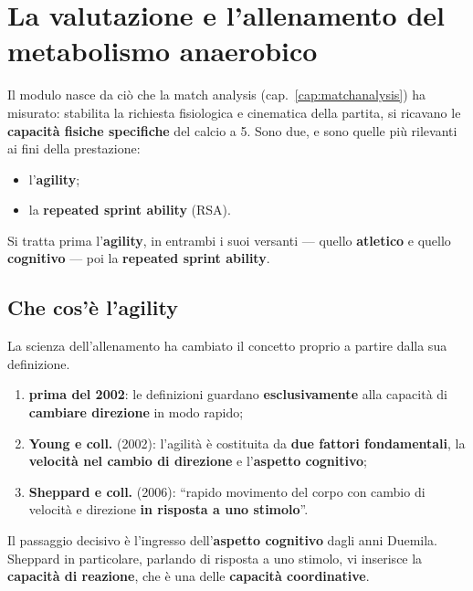 \chapter{La valutazione e l'allenamento del metabolismo anaerobico}
\label{cap:metabolismoanaerobico}

Il modulo nasce da ciò che la match analysis (cap.~\ref{cap:matchanalysis}) ha misurato: stabilita
la richiesta fisiologica e cinematica della partita, si ricavano le \textbf{capacità fisiche
specifiche} del calcio a 5. Sono due, e sono quelle più rilevanti ai fini della prestazione:

\begin{itemize}
  \item l'\textbf{agility};
  \item la \textbf{repeated sprint ability} (RSA).
\end{itemize}

Si tratta prima l'\textbf{agility}, in entrambi i suoi versanti --- quello \textbf{atletico} e
quello \textbf{cognitivo} --- poi la \textbf{repeated sprint ability}.

\section{Che cos'è l'agility}

La scienza dell'allenamento ha cambiato il concetto proprio a partire dalla sua definizione.
\begin{enumerate}
  \item \textbf{prima del 2002}: le definizioni guardano \textbf{esclusivamente} alla capacità di
    \textbf{cambiare direzione} in modo rapido;
  \item \textbf{Young e coll.} (2002): l'agilità è costituita da \textbf{due fattori
    fondamentali}, la \textbf{velocità nel cambio di direzione} e l'\textbf{aspetto cognitivo};
  \item \textbf{Sheppard e coll.} (2006): ``rapido movimento del corpo con cambio di velocità e
    direzione \textbf{in risposta a uno stimolo}''.
\end{enumerate}

Il passaggio decisivo è l'ingresso dell'\textbf{aspetto cognitivo} dagli anni Duemila. Sheppard in
particolare, parlando di risposta a uno stimolo, vi inserisce la \textbf{capacità di reazione}, che
è una delle \textbf{capacità coordinative}.

